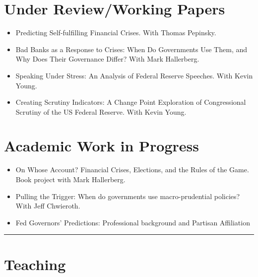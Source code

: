 \documentclass[a4paper]{article}
\begin{document}
\section*{Under Review/Working Papers}

\begin{itemize}

    \item Predicting Self-fulfilling Financial Crises. With Thomas Pepinsky.

    \item Bad Banks as a Response to Crises: When Do Governments Use Them, and Why Does Their Governance Differ? With Mark Hallerberg.

    \item Speaking Under Stress: An Analysis of Federal Reserve Speeches. With Kevin Young.

    \item Creating Scrutiny Indicators: A Change Point Exploration of Congressional Scrutiny of the US Federal Reserve. With Kevin Young.

\end{itemize}

\section*{Academic Work in Progress}

\begin{itemize}

    \item On Whose Account? Financial Crises, Elections, and the Rules of the Game. Book project with Mark Hallerberg.

    \item Pulling the Trigger: When do governments use macro-prudential policies? With Jeff Chwieroth.

    \item Fed Governors' Predictions: Professional background and Partisan Affiliation

\end{itemize}


\vspace{0.25cm}
\medskip\hrule height 1pt
\vspace{0.5cm}

\section*{Teaching}
\end{document}
